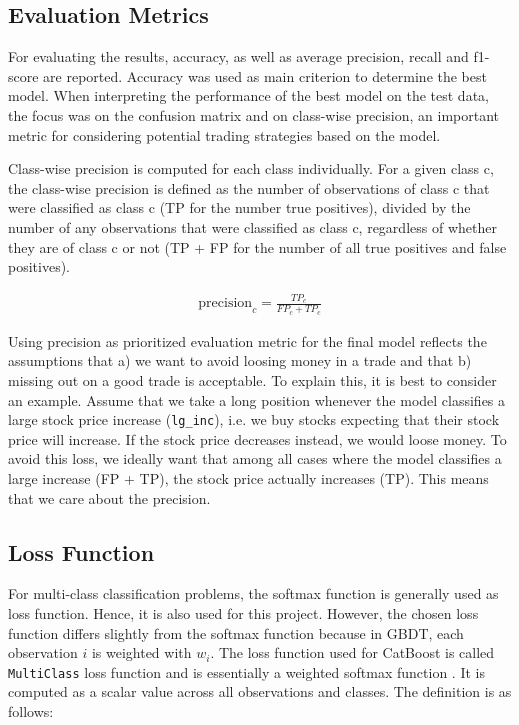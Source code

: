 \documentclass{article}
\begin{document}
	\subsection{Evaluation Metrics}
	
	For evaluating the results, accuracy, as well as average precision, recall and f1-score are reported. Accuracy was used as main criterion to determine the best model. When interpreting the performance of the best model on the test data, the focus was on the confusion matrix and on class-wise precision, an important metric for considering potential trading strategies based on the model.
	
	Class-wise precision is computed for each class individually. For a given class c, the class-wise precision is defined as the number of observations of class c that were classified as class c (TP for the number true positives), divided by the number of any observations that were classified as class c, regardless of whether they are of class c or not (TP + FP for the number of all true positives and false positives).
	
	\begin{align}
	\mathrm{precision}_c = \frac{TP_c}{FP_c + TP_c}
	\end{align}
	
	Using precision as prioritized evaluation metric for the final model reflects the assumptions that a) we want to avoid loosing money in a trade and that b) missing out on a good trade is acceptable. To explain this, it is best to consider an example. Assume that we take a long position whenever the model classifies a large stock price increase (\verb|lg_inc|), i.e. we buy stocks expecting that their stock price will increase. If the stock price decreases instead, we would loose money. To avoid this loss, we ideally want that among all cases where the model classifies a large increase (FP + TP), the stock price actually increases (TP). This means that we care about the precision. 
	
	\subsection{Loss Function}
	
	For multi-class classification problems, the softmax function is generally used as loss function. Hence, it is also used for this project. However, the chosen loss function differs slightly from the softmax function because in GBDT, each observation $i$ is weighted with $w_i$. The loss function used for CatBoost is called \lstinline{MultiClass} loss function and is essentially a weighted softmax function \cite{noauthor_multiclassification:_nodate}. It is computed as a scalar value across all observations and classes. The definition is as follows:
	
\end{document}
